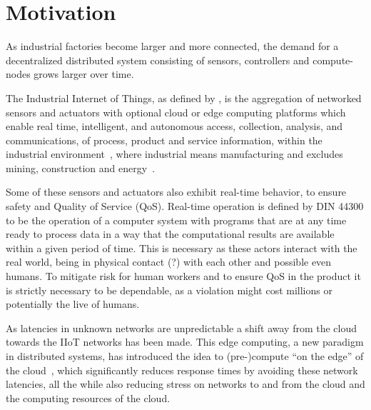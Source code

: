 \section{Motivation}


As industrial factories become larger and more connected, the demand for a
decentralized distributed system consisting of sensors, controllers and
compute-nodes grows larger over time.

The Industrial Internet of Things, as defined by
\citeauthor{boyes_industrial_2018}, is the aggregation of networked sensors and
actuators with optional cloud or edge computing platforms which enable real
time, intelligent, and autonomous access, collection, analysis, and
communications, of process, product and service information, within the
industrial environment~\cite{boyes_industrial_2018}, where industrial means
manufacturing and excludes mining, construction and
energy~\cite{noauthor_industry_nodate}.

Some of these sensors and actuators also exhibit real-time behavior, to ensure
safety and Quality of Service (QoS). Real-time operation is defined by DIN 44300
to be the operation of a computer system with programs that are at any time
ready to process data in a way that the computational results are available
within a given period of time. This is necessary as these actors interact with
the real world, being in physical contact (?) with each other and possible even
humans. To mitigate risk for human workers and to ensure QoS in the product it
is strictly necessary to be dependable, as a violation might cost millions or
potentially the live of humans.


As latencies in unknown networks are unpredictable a shift away from the cloud
towards the IIoT networks has been made. This edge computing, a new paradigm in
distributed systems, has introduced the idea to (pre-)compute \enquote{on the
edge} of the cloud~\cite{shi_edge_2016}, which significantly reduces response
times by avoiding these network latencies, all the while also reducing stress on
networks to and from the cloud and the computing resources of the cloud.

